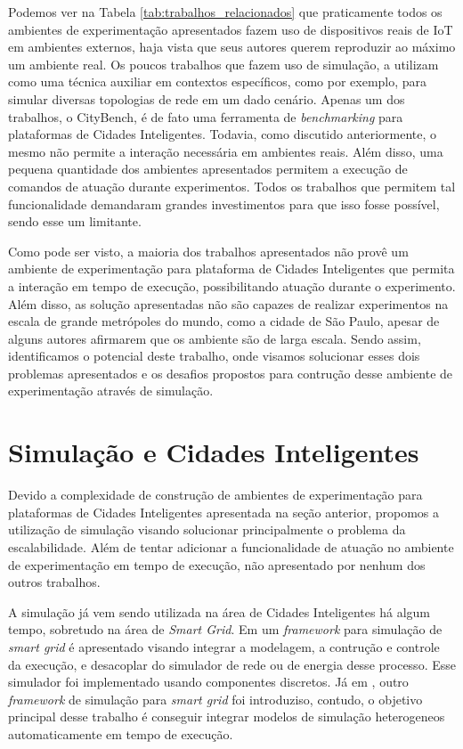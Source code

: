 Podemos ver na Tabela \ref{tab:trabalhos_relacionados} que praticamente todos os ambientes de experimentação apresentados fazem uso de dispositivos reais de IoT em ambientes externos, haja vista que seus 
autores querem reproduzir ao máximo um ambiente real.
Os poucos trabalhos que fazem uso de simulação, a utilizam como uma técnica auxiliar em contextos específicos, como por exemplo, para simular diversas topologias de rede em um dado cenário.
Apenas um dos trabalhos, o CityBench, é de fato uma ferramenta de \textit{benchmarking} para plataformas de Cidades Inteligentes.
Todavia, como discutido anteriormente, o mesmo não permite a interação necessária em ambientes reais.
Além disso, uma pequena quantidade dos ambientes apresentados permitem a execução de comandos de atuação durante experimentos.
Todos os trabalhos que permitem tal funcionalidade demandaram grandes investimentos para que isso fosse possível, sendo esse um limitante.

Como pode ser visto, a maioria dos trabalhos apresentados não provê um ambiente de experimentação para plataforma de Cidades Inteligentes que permita a interação em tempo de execução, possibilitando
atuação durante o experimento.
Além disso, as solução apresentadas não são capazes de realizar experimentos na escala de grande metrópoles do mundo, como a cidade de São Paulo, apesar de alguns autores afirmarem que os ambiente são de
larga escala.
Sendo assim, identificamos o potencial deste trabalho, onde visamos solucionar esses dois problemas apresentados e os desafios propostos para contrução desse ambiente de experimentação através
de simulação.

\section{Simulação e Cidades Inteligentes}

Devido a complexidade de construção de ambientes de experimentação para plataformas de Cidades Inteligentes apresentada na seção anterior, propomos a utilização de simulação visando solucionar
principalmente o problema da escalabilidade.
Além de tentar adicionar a funcionalidade de atuação no ambiente de experimentação em tempo de execução, não apresentado por nenhum dos outros trabalhos.

A simulação já vem sendo utilizada na área de Cidades Inteligentes há algum tempo, sobretudo na área de \textit{Smart Grid}.
Em \cite{jsan_2016} um \textit{framework} para simulação de \textit{smart grid} é apresentado visando integrar a modelagem, a contrução e controle da execução, e desacoplar do simulador de rede
ou de energia desse processo.
Esse simulador foi implementado usando componentes discretos.
Já em \cite{schutte_2011}, outro \textit{framework} de simulação para \textit{smart grid} foi introduziso, contudo, o objetivo principal desse trabalho é conseguir integrar modelos de simulação
heterogeneos automaticamente em tempo de execução.

